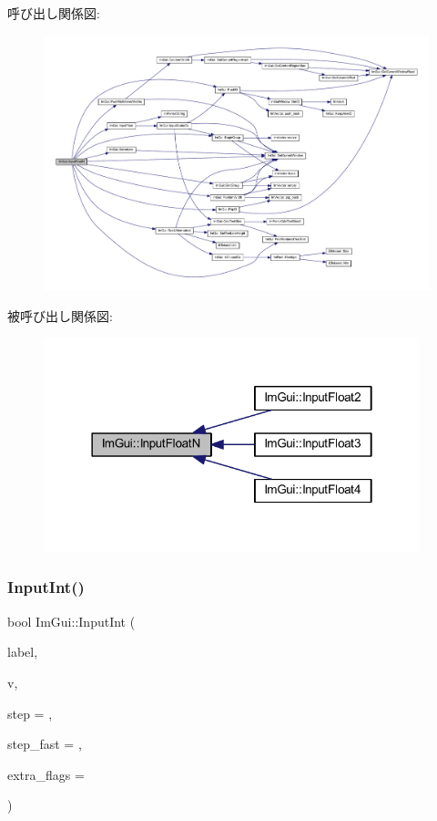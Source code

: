 呼び出し関係図\+:\nopagebreak
\begin{figure}[H]
\begin{center}
\leavevmode
\includegraphics[width=350pt]{namespace_im_gui_a7fe2c74d1c0042b77d8e6788faed0983_cgraph}
\end{center}
\end{figure}
被呼び出し関係図\+:\nopagebreak
\begin{figure}[H]
\begin{center}
\leavevmode
\includegraphics[width=310pt]{namespace_im_gui_a7fe2c74d1c0042b77d8e6788faed0983_icgraph}
\end{center}
\end{figure}
\mbox{\label{namespace_im_gui_a8b5e9de08c18d6053d2f718b99be94a6}} 
\subsubsection{\texorpdfstring{Input\+Int()}{InputInt()}}
{\footnotesize\ttfamily bool Im\+Gui\+::\+Input\+Int (\begin{DoxyParamCaption}\item[{const char $\ast$}]{label,  }\item[{int $\ast$}]{v,  }\item[{int}]{step = {},  }\item[{int}]{step\+\_\+fast = {},  }\item[{\mbox{\hyperlink{imgui_8h_a7d2c6153a6b9b5d3178ce82434ac9fb8}{Im\+Gui\+Input\+Text\+Flags}}}]{extra\+\_\+flags = {} }\end{DoxyParamCaption})}



